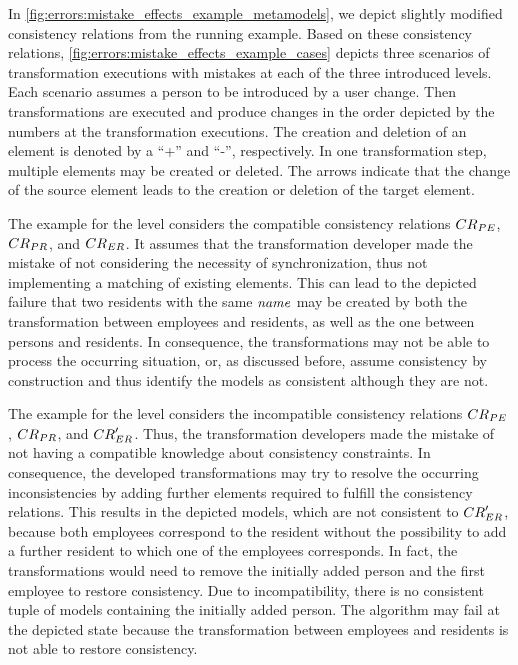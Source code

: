 In \autoref{fig:errors:mistake_effects_example_metamodels}, we depict slightly modified consistency relations from the running example.
Based on these consistency relations, \autoref{fig:errors:mistake_effects_example_cases} depicts three scenarios of transformation executions with mistakes at each of the three introduced levels.
Each scenario assumes a person to be introduced by a user change.
Then transformations are executed and produce changes in the order depicted by the numbers at the transformation executions.
The creation and deletion of an element is denoted by a \enquote{+} and \enquote{-}, respectively.
In one transformation step, multiple elements may be created or deleted.
The arrows indicate that the change of the source element leads to the creation or deletion of the target element.

The example for the \leveltransformation level considers the compatible consistency relations $\consistencyrelation{CR}{PE}$, $\consistencyrelation{CR}{PR}$, and $\consistencyrelation{CR}{ER}$. It assumes that the transformation developer made the mistake of not considering the necessity of synchronization, thus not implementing a matching of existing elements.
This can lead to the depicted failure that two residents with the same $\mathit{name}$ may be created by both the transformation between employees and residents, as well as the one between persons and residents.
In consequence, the transformations may not be able to process the occurring situation, or, as discussed before, assume consistency by construction and thus identify the models as consistent although they are not.

The example for the \levelnetworkrelation level considers the incompatible consistency relations $\consistencyrelation{CR}{PE}$, $\consistencyrelation{CR}{PR}$, and $\consistencyrelation{CR}{ER}'$. Thus, the transformation developers made the mistake of not having a compatible knowledge about consistency constraints.
In consequence, the developed transformations may try to resolve the occurring inconsistencies by adding further elements required to fulfill the consistency relations.
This results in the depicted models, which are not consistent to $\consistencyrelation{CR}{ER}'$, because both employees correspond to the resident without the possibility to add a further resident to which one of the employees corresponds.
In fact, the transformations would need to remove the initially added person and the first employee to restore consistency.
Due to incompatibility, there is no consistent tuple of models containing the initially added person.
The algorithm may fail at the depicted state because the transformation between employees and residents is not able to restore consistency.

